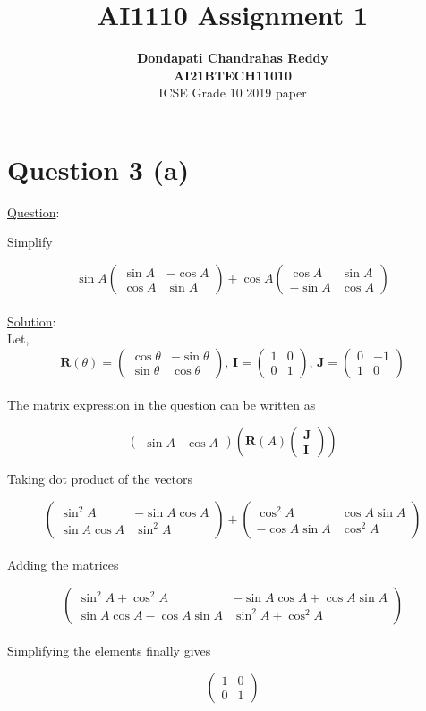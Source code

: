 \documentclass[journal,12pt,twocolumn]{IEEEtran}
\newcommand{\myvec}[1]{\ensuremath{\begin{pmatrix}#1\end{pmatrix}}}
\let\vec\mathbf
\begin{document}
\title{\textbf{AI1110 Assignment 1} }
\author{\textbf{Dondapati Chandrahas Reddy}\\ \textbf{AI21BTECH11010}\\ ICSE Grade 10 2019 paper}

\maketitle

{\section {Question 3 (a) \newline}}

{\large \underline{Question}:\newline}

Simplify

\begin{equation*}
	\sin A\myvec{\sin A &  -\cos A \\ \cos A & \sin A} + \cos A \myvec{\cos A &  \sin A \\ -\sin A & \cos A}
\end{equation*}\\

{\large \underline{Solution}:}\\

Let,
\begin{equation*}
	\vec{R}(\theta) = \myvec{\cos \theta &  -\sin \theta \\ \sin \theta & \cos \theta} ,\, \vec{I} = \myvec{1 & 0 \\ 0 & 1} ,\, \vec{J} = \myvec{0 & -1 \\ 1 & 0}
\end{equation*}\\

The matrix expression in the question can be written as

\begin{equation*}
	\myvec{\sin A & \cos A} \left( \vec{R}(A) \myvec{\vec{J} \\ \vec{I}} \right)
\end{equation*}

Taking dot product of the vectors

\begin{equation*}
	\myvec{\sin^2 A &  -\sin A\cos A \\ \sin A\cos A & \sin^2 A} +\myvec{\cos^2 A & \cos A\sin A \\ -\cos A\sin A & \cos^2 A}
\end{equation*}\\

Adding the matrices

\begin{equation*}
	\myvec{\sin^2 A + \cos^2 A &  -\sin A \cos A +\cos A \sin A \\ \sin A \cos A -\cos A \sin A & \sin^2 A + \cos^2 A}
\end{equation*}\\

Simplifying the elements finally gives

\begin{equation*}
	\myvec{1 & 0 \\ 0 & 1}
\end{equation*}\\
\end{document}
